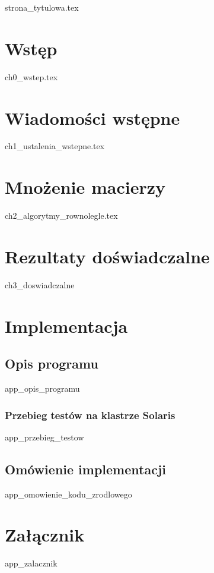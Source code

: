 \documentclass[a4paper,oneside,leqno,12pt]{book}
\begin{document}
{strona_tytulowa.tex}
\tableofcontents

\chapter*{Wstęp}
{ch0_wstep.tex}

\chapter{Wiadomości wstępne}
{ch1_ustalenia_wstepne.tex}

\chapter{Mnożenie macierzy}
{ch2_algorytmy_rownolegle.tex}

\chapter{Rezultaty doświadczalne}\label{ch:performance}
{ch3_doswiadczalne}

\begin{appendices}
\chapter{Implementacja}
\section{Opis programu}
{app_opis_programu}
	\subsection{Przebieg testów na klastrze Solaris}
	{app_przebieg_testow}
	
\section{Omówienie implementacji}
{app_omowienie_kodu_zrodlowego}
\chapter{Załącznik}
{app_zalacznik}
\end{appendices}


\end{document}
